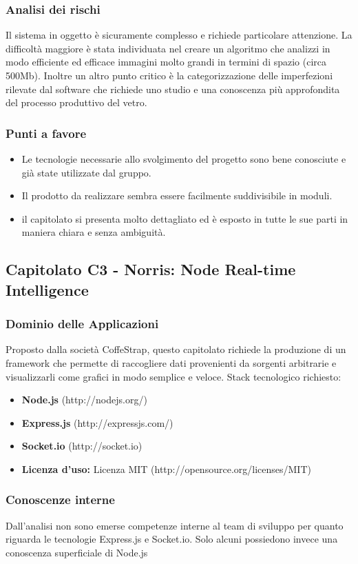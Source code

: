   \subsubsection{Analisi dei rischi}
  Il sistema in oggetto è sicuramente complesso e richiede particolare attenzione. La difficoltà maggiore è stata individuata nel creare un algoritmo che analizzi in modo efficiente ed efficace immagini molto grandi in termini di spazio (circa 500Mb). Inoltre un altro punto critico è la categorizzazione delle imperfezioni rilevate dal software che richiede uno studio e una conoscenza più approfondita del processo produttivo del vetro.
  \subsubsection{Punti a favore}
  \begin{itemize}
  	\item Le tecnologie necessarie allo svolgimento del progetto sono bene conosciute e già state utilizzate dal gruppo.
  	\item Il prodotto da realizzare sembra essere facilmente suddivisibile in moduli.
  	\item il capitolato si presenta molto dettagliato ed è esposto in tutte le sue parti in maniera chiara e senza ambiguità.
  \end{itemize}
\newpage
\subsection{Capitolato C3 - Norris: Node Real-time Intelligence}
  \subsubsection{Dominio delle Applicazioni}
  Proposto dalla società CoffeStrap, questo capitolato richiede la produzione di un framework che permette di raccogliere dati provenienti da sorgenti arbitrarie e visualizzarli come grafici in modo semplice e veloce. Stack tecnologico richiesto:
  \begin{itemize}
  	\item \textbf{Node.js} (http://nodejs.org/)
  	\item \textbf{Express.js} (http://expressjs.com/)
  	\item \textbf{Socket.io} (http://socket.io)
  	\item \textbf{Licenza d'uso:} Licenza MIT (http://opensource.org/licenses/MIT)
  \end{itemize}
  \subsubsection{Conoscenze interne}
  Dall'analisi non sono emerse competenze interne al team di sviluppo per quanto riguarda le tecnologie Express.js e Socket.io. Solo alcuni possiedono invece una conoscenza superficiale di Node.js
